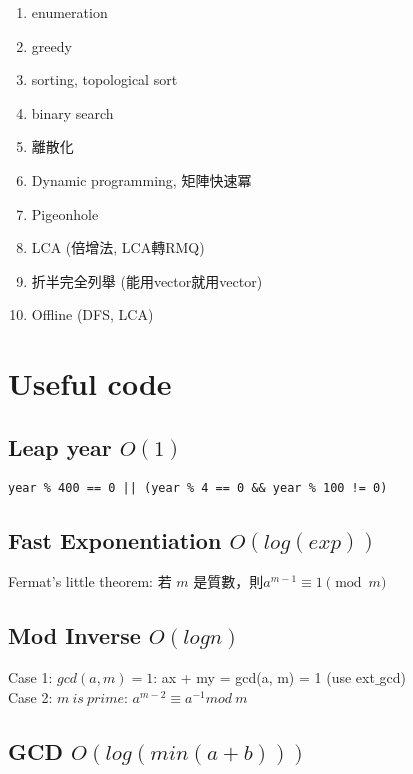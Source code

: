 \documentclass[10pt,oneside]{article}
\begin{document}
\begin{landscape}
\begin{multicols}{2}
\begin{enumerate}
	\item enumeration
	\item greedy 
	\item sorting, topological sort
	\item binary search
	\item 離散化
	\item Dynamic programming, 矩陣快速冪
	\item Pigeonhole 
	\item LCA (倍增法, LCA轉RMQ)
	\item 折半完全列舉 (能用vector就用vector)
	\item Offline (DFS, LCA)
\end{enumerate}


\section{Useful code}

\subsection{Leap year $O(1)$}

\begin{lstlisting}
year % 400 == 0 || (year % 4 == 0 && year % 100 != 0)
\end{lstlisting}

\subsection{Fast Exponentiation $O(log(exp))$}

Fermat's little theorem: 若 $m$ 是質數，則$a^{m-1} \equiv 1 \pmod m$


\subsection{Mod Inverse $ O(log n) $}

Case 1: $gcd(a, m) = 1$:  ax + my = gcd(a, m) = 1 (use ext$\_$gcd) \\

\noindent Case 2: $m\ is\ prime$: $a^{m - 2} \equiv a^{-1} mod\ m$ 

\subsection{GCD $O(log( min(a + b) ))$}


\end{multicols}
\end{landscape}
\end{document}
